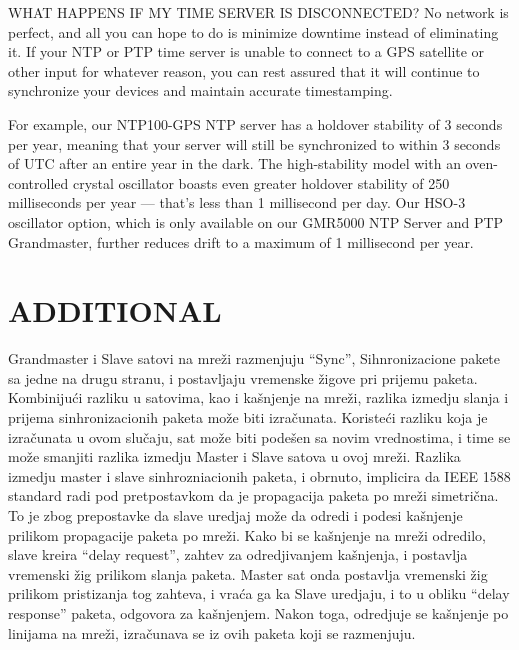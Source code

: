 \documentclass[a4paper,12pt, master]{etf}
\begin{document}
	WHAT HAPPENS IF MY TIME SERVER IS DISCONNECTED\@?
	No network is perfect, and all you can hope to do is minimize downtime instead of
	eliminating it. If your NTP or PTP time server is unable to connect to a GPS satellite or
	other input for whatever reason, you can rest assured that it will continue to
	synchronize your devices and maintain accurate timestamping.

	For example, our NTP100-GPS NTP server has a holdover stability of 3 seconds per year,
	meaning that your server will still be synchronized to within 3 seconds of UTC after an
	entire year in the dark. The high-stability model with an oven-controlled crystal
	oscillator boasts even greater holdover stability of 250 milliseconds per year — that's
	less than 1 millisecond per day. Our HSO-3 oscillator option, which is only available on
	our GMR5000 NTP Server and PTP Grandmaster, further reduces drift to a maximum of 1
	millisecond per year.

	\newpage

	\chapter{ADDITIONAL}

	Grandmaster i Slave satovi na mre\v{z}i razmenjuju ``Sync'', Sihnronizacione pakete sa jedne na
	drugu stranu, i postavljaju vremenske \v{z}igove pri prijemu paketa. Kombiniju\'{c}i razliku u
	satovima, kao i ka\v{s}njenje na mre\v{z}i, razlika izmedju slanja i prijema sinhronizacionih
	paketa mo\v{z}e biti izra\v{c}unata. Koriste\'{c}i razliku koja je izra\v{c}unata u ovom slu\v{c}aju, sat
	mo\v{z}e biti pode\v{s}en sa novim vrednostima, i time se mo\v{z}e smanjiti razlika izmedju Master i
	Slave satova u ovoj mre\v{z}i. Razlika izmedju master i slave sinhrozniacionih paketa, i
	obrnuto, implicira da IEEE 1588 standard radi pod pretpostavkom da je propagacija paketa
	po mre\v{z}i simetri\v{c}na. To je zbog prepostavke da slave uredjaj mo\v{z}e da odredi i podesi
	ka\v{s}njenje prilikom propagacije paketa po mre\v{z}i. Kako bi se ka\v{s}njenje na mre\v{z}i odredilo,
	slave kreira ``delay request'', zahtev za odredjivanjem ka\v{s}njenja, i postavlja vremenski
	\v{z}ig prilikom slanja paketa. Master sat onda postavlja vremenski \v{z}ig prilikom pristizanja
	tog zahteva, i vra\'{c}a ga ka Slave uredjaju, i to u obliku ``delay response'' paketa, odgovora za
        ka\v{s}njenjem. Nakon toga, odredjuje se ka\v{s}njenje po linijama na mre\v{z}i, izra\v{c}unava
        se iz ovih paketa koji se razmenjuju.
\end{document}

